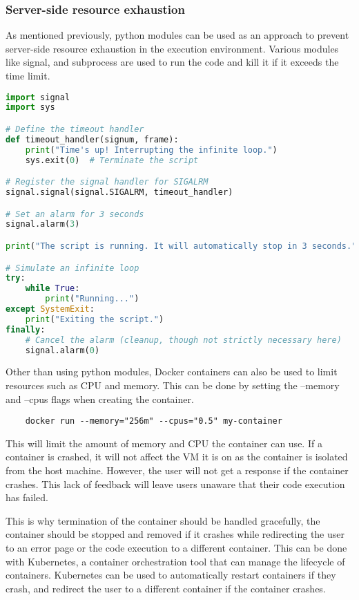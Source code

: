 \subsubsection{Server-side resource exhaustion}
As mentioned previously, python modules can be used as an approach to prevent server-side resource exhaustion in the execution environment. Various modules like signal, and subprocess are used to run the code and kill it if it exceeds the time limit.
\begin{lstlisting}[language=Python, caption=Server-side resource exhaustion prevention with python module signal, label=lst:server_side_resource_exhaustion]
import signal
import sys

# Define the timeout handler
def timeout_handler(signum, frame):
    print("Time's up! Interrupting the infinite loop.")
    sys.exit(0)  # Terminate the script

# Register the signal handler for SIGALRM
signal.signal(signal.SIGALRM, timeout_handler)

# Set an alarm for 3 seconds
signal.alarm(3)

print("The script is running. It will automatically stop in 3 seconds.")

# Simulate an infinite loop
try:
    while True:
        print("Running...")
except SystemExit:
    print("Exiting the script.")
finally:
    # Cancel the alarm (cleanup, though not strictly necessary here)
    signal.alarm(0)
\end{lstlisting}

Other than using python modules, Docker containers can also be used to limit resources such as CPU and memory. This can be done by setting the --memory and --cpus flags when creating the container.
\begin{verbatim}
    docker run --memory="256m" --cpus="0.5" my-container
\end{verbatim}
This will limit the amount of memory and CPU the container can use. If a container is crashed, it will not affect the VM it is on as the container is isolated from the host machine. However, the user will not get a response if the container crashes. This lack of feedback will leave users unaware that their code execution has failed.

This is why termination of the container should be handled gracefully, the container should be stopped and removed if it crashes while redirecting the user to an error page or the code execution to a different container. This can be done with Kubernetes, a container orchestration tool that can manage the lifecycle of containers. Kubernetes can be used to automatically restart containers if they crash, and redirect the user to a different container if the container crashes.


